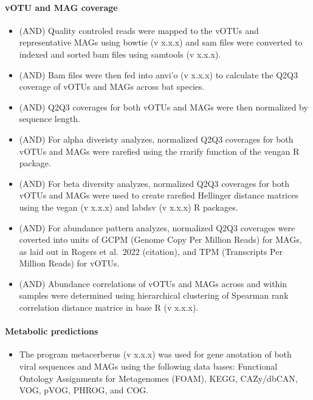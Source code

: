 \documentclass[
]{article}
\providecommand{\tightlist}{%
  \setlength{\itemsep}{0pt}\setlength{\parskip}{0pt}}
\begin{document}
\paragraph{vOTU and MAG coverage}\label{votu-and-mag-coverage}

\begin{itemize}
\tightlist
\item
  (AND) Quality controled reads were mapped to the vOTUs and
  representative MAGs using bowtie (v x.x.x) and sam files were
  converted to indexed and sorted bam files using samtools (v x.x.x).
\item
  (AND) Bam files were then fed into anvi'o (v x.x.x) to calculate the
  Q2Q3 coverage of vOTUs and MAGs across bat species.
\item
  (AND) Q2Q3 coverages for both vOTUs and MAGs were then normalized by
  sequence length.
\item
  (AND) For alpha diveristy analyzes, normalized Q2Q3 coverages for both
  vOTUs and MAGs were rarefied using the rrarify function of the vengan
  R package.
\item
  (AND) For beta diversity analyzes, normalized Q2Q3 coverages for both
  vOTUs and MAGs were used to create rarefied Hellinger distance
  matrices using the vegan (v x.x.x) and labdsv (v x.x.x) R packages.
\item
  (AND) For abundance pattern analyzes, normalized Q2Q3 coverages were
  coverted into units of GCPM (Genome Copy Per Million Reads) for MAGs,
  as laid out in Rogers et al.~2022 (citation), and TPM (Transcripts Per
  Million Reads) for vOTUs.
\item
  (AND) Abundance correlations of vOTUs and MAGs across and within
  samples were determined using hierarchical clustering of Spearman rank
  correlation distance matrice in base R (v x.x.x).
\end{itemize}

\paragraph{Metabolic predictions}\label{metabolic-predictions}

\begin{itemize}
\tightlist
\item
  The program metacerberus (v x.x.x) was used for gene anotation of both
  viral sequences and MAGs using the following data bases: Functional
  Ontology Assignments for Metagenomes (FOAM), KEGG, CAZy/dbCAN, VOG,
  pVOG, PHROG, and COG.
\end{itemize}
\end{document}
